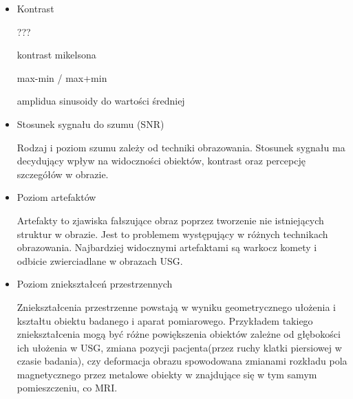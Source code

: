 \begin{itemize}
    \item Kontrast

          ???

          kontrast mikelsona

          max-min / max+min

          amplidua sinusoidy do wartości średniej


    \item Stosunek sygnału do szumu (SNR)

          Rodzaj i poziom szumu zależy od techniki obrazowania.
          Stosunek sygnału ma decydujący wpływ na widoczności obiektów, kontrast oraz percepcję szczegółów w obrazie.

    \item Poziom artefaktów

          Artefakty to zjawiska fałszujące obraz poprzez tworzenie nie istniejących struktur w obrazie.
          Jest to problemem występujący w różnych technikach obrazowania.
          Najbardziej widocznymi artefaktami są warkocz komety i odbicie zwierciadlane w obrazach USG.

    \item Poziom zniekształceń przestrzennych

          Zniekształcenia przestrzenne powstają w wyniku geometrycznego ułożenia i kształtu obiektu badanego i aparat pomiarowego.
          Przykładem takiego zniekształcenia mogą być różne powiększenia obiektów zależne od głębokości ich ułożenia w USG, zmiana pozycji pacjenta(przez ruchy klatki piersiowej w czasie badania), czy deformacja obrazu spowodowana zmianami rozkładu pola magnetycznego przez metalowe obiekty w znajdujące się w tym samym pomieszczeniu, co MRI.

\end{itemize}